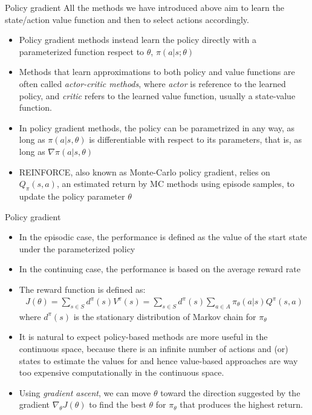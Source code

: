 \documentclass[10pt,mathserif]{beamer}
\begin{document}
\begin{frame}{Policy gradient}
All the methods we have introduced above aim to learn the state/action value function and then to select actions
accordingly. 
\begin{itemize}
\item Policy gradient methods instead learn the policy directly with a parameterized function respect to $\theta$,
$\pi(a|s;\theta)$
\item Methods that learn approximations to both policy and value functions are often called \textit{actor-critic methods}, where \textit{actor} is reference to the learned policy, and \textit{critic} refers to the learned value function, usually a state-value function.
\item In policy gradient methods, the policy can be parametrized in any way, as long as $\pi(a|s,\theta)$ is
differentiable with respect to its parameters, that is, as long as $\nabla\pi(a|s,\theta)$
\item REINFORCE, also known as Monte-Carlo policy gradient, relies on $Q_\pi(s,a)$, an estimated return by MC methods using episode samples, to update the policy parameter $\theta$
\end{itemize}
\end{frame}


\begin{frame}{Policy gradient}
\begin{itemize}
\item In the episodic case, the performance is defined as the value of the start state under the parameterized 
policy
\item In the continuing case, the performance is based on the average reward rate
\item The reward function is defined as:
\begin{align}
J(\theta) = \sum_{s\in S} d^{\pi}(s)V^{\pi}(s) = \sum_{s\in S}d^{\pi}(s) \sum_{a\in A}\pi_{\theta}(a|s)Q^{\pi}(s,a)
\end{align}
where $d^{\pi}(s)$ is the stationary distribution of Markov chain for $\pi_\theta$
\item It is natural to expect policy-based methods are more useful in the continuous space, because there is an
infinite number of actions and (or) states to estimate the values for and hence value-based approaches are way
too expensive computationally in the continuous space. 
\item Using \textit{gradient ascent}, we can move $\theta$ toward the direction suggested by the gradient $\nabla_\theta J(\theta)$ to find the best $\theta$ for $\pi_\theta$ that produces the highest return.
\end{itemize}
\end{frame}
\end{document}
